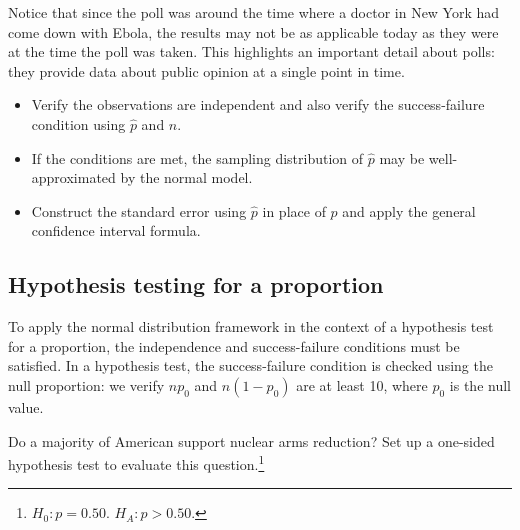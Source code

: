 Notice that since the poll was around the time where a doctor in New York had come down with Ebola, the results may not be as applicable today as they were at the time the poll was taken. This highlights an important detail about polls: they provide data about public opinion at a single point in time.

\begin{termBox}{\vspace{-1mm}
\begin{itemize}
\setlength{\itemsep}{0mm}
\item Verify the observations are independent and also verify the success-failure condition using $\hat{p}$ and $n$.
\item If the conditions are met, the sampling distribution of $\hat{p}$ may be well-approximated by the normal model.
\item Construct the standard error using $\hat{p}$ in place of $p$ and apply the general confidence interval formula.\vspace{1mm}
\end{itemize}}
\end{termBox}


\subsection{Hypothesis testing for a proportion}
\label{htForPropSection}

To apply the normal distribution framework in the context of a hypothesis test for a proportion, the independence and success-failure conditions must be satisfied. In a hypothesis test, the success-failure condition is checked using the null proportion: we verify $np_0$ and $n(1-p_0)$ are at least 10, where $p_0$ is the null value.


\begin{exercise}
Do a majority of American support nuclear arms reduction? Set up a one-sided hypothesis test to evaluate this question.\footnote{$H_0: p = 0.50$. $H_A: p > 0.50$.}
\end{exercise}

